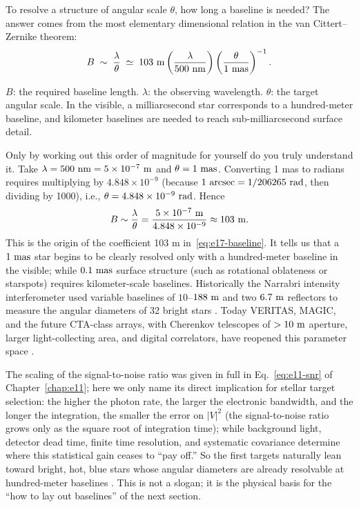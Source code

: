 To resolve a structure of angular scale \(\theta\), how long a baseline is needed? The answer comes from the most elementary dimensional relation in the van Cittert--Zernike theorem:
\begin{equation}
  B \;\sim\; \frac{\lambda}{\theta}
  \;\simeq\; 103~{\rm m}
  \left(\frac{\lambda}{500~{\rm nm}}\right)
  \left(\frac{\theta}{1~{\rm mas}}\right)^{-1}.
  \label{eq:e17-baseline}
\end{equation}
\begin{formulaexplain}
\(B\): the required baseline length. \(\lambda\): the observing wavelength. \(\theta\): the target angular scale. In the visible, a milliarcsecond star corresponds to a hundred-meter baseline, and kilometer baselines are needed to reach sub-milliarcsecond surface detail.
\end{formulaexplain}
Only by working out this order of magnitude for yourself do you truly understand it. Take \(\lambda=500~{\rm nm}=5\times10^{-7}~{\rm m}\) and \(\theta=1~{\rm mas}\). Converting 1 mas to radians requires multiplying by \(4.848\times10^{-9}\) (because \(1~{\rm arcsec}=1/206265~{\rm rad}\), then dividing by 1000), i.e., \(\theta=4.848\times10^{-9}~{\rm rad}\). Hence
\[
  B\sim\frac{\lambda}{\theta}=\frac{5\times10^{-7}~{\rm m}}{4.848\times10^{-9}}
  \approx 103~{\rm m}.
\]
This is the origin of the coefficient 103 m in~\eqref{eq:e17-baseline}. It tells us that a \(1~{\rm mas}\) star begins to be clearly resolved only with a hundred-meter baseline in the visible; while \(0.1~{\rm mas}\) surface structure (such as rotational oblateness or starspots) requires kilometer-scale baselines. Historically the Narrabri intensity interferometer used variable baselines of \(10\)--\(188~{\rm m}\) and two \(6.7~{\rm m}\) reflectors to measure the angular diameters of 32 bright stars \citep{1974MNRAS.167..121H,1974iiia.book.....H}. Today VERITAS, MAGIC, and the future CTA-class arrays, with Cherenkov telescopes of \(>10~{\rm m}\) aperture, larger light-collecting area, and digital correlators, have reopened this parameter space \citep{2020NatAs...4.1164A,2024MNRAS.529.4387A}.

The scaling of the signal-to-noise ratio was given in full in Eq.~\eqref{eq:e11-snr} of Chapter~\ref{chap:e11}; here we only name its direct implication for stellar target selection: the higher the photon rate, the larger the electronic bandwidth, and the longer the integration, the smaller the error on \(|V|^2\) (the signal-to-noise ratio grows only as the square root of integration time); while background light, detector dead time, finite time resolution, and systematic covariance determine where this statistical gain ceases to ``pay off.'' So the first targets naturally lean toward bright, hot, blue stars whose angular diameters are already resolvable at hundred-meter baselines \citep{2013MNRAS.430.3187R,2020NatAs...4.1164A}. This is not a slogan; it is the physical basis for the ``how to lay out baselines'' of the next section.

